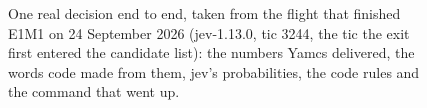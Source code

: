 \begin{figure}[htbp]
\caption{One real decision end to end, taken from the flight that finished E1M1 on 24 September 2026 (jev-1.13.0, tic 3244, the tic the exit first entered the candidate list): the numbers Yamcs delivered, the words code made from them, jev's probabilities, the code rules and the command that went up.}
\end{figure}
